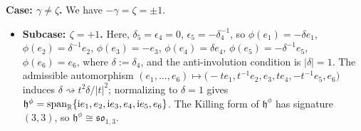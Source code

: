 \documentclass[pdftex]{sigma}
\newlength{\caseIndent}
\DeclareMathOperator{\spanOperator}{span}
\newcommand{\bbR}{\mathbb{R}}
\newcommand{\mfh} {\mathfrak{h}}
\newcommand{\mfso} {\mathfrak{so}}
\numberwithin{equation}{section}
\begin{document}
\smallskip
\noindent \textbf{Case: $\gamma \neq \zeta$.} We have $-\gamma = \zeta = \pm 1$.
\begin{itemize}[leftmargin=\caseIndent]
	\item[] \textbf{Subcase: $\zeta = +1$.} Here, $\delta_5 = \epsilon_4 = 0$, $\epsilon_5 = -\delta_4^{-1}$, so $\phi(e_1) = -\delta e_1$, $\phi(e_2) = \delta^{-1} e_2$, $\phi(e_3) = -e_3$, $\phi(e_4) = \delta e_4$, $\phi(e_5) = -\delta^{-1} e_5$, $\phi(e_6) = e_6$, where $\delta := \delta_4$, and the anti-involution condition is $|\delta| = 1$. The admissible automorphism $(e_1, \ldots, e_6) \mapsto \big({-}t e_1, t^{-1} e_2, e_3, t e_4, -t^{-1} e_5, e_6\big)$ induces $\delta \rightsquigarrow t^2 \delta / |t|^2$; normalizing to $\delta = 1$ gives $\mfh^{\phi} = \spanOperator_{\bbR}\{{\rm i} e_1, e_2, {\rm i} e_3, e_4, {\rm i} e_5, e_6\}$. The Killing form of $\mfh^{\phi}$ has signature $(3, 3)$, so $\mfh^{\phi} \cong \mfso_{1, 3}$.


\end{itemize}
\end{document}
